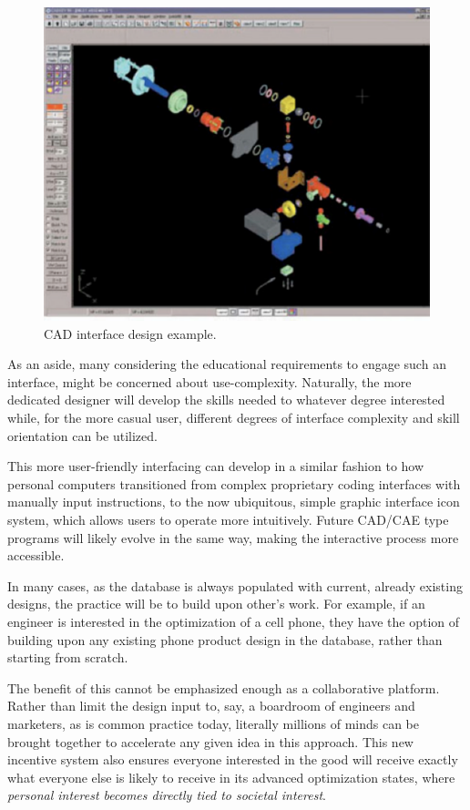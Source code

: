 \documentclass[10pt, a4paper, cleardoubleempty, openright, twoside]{book}
\begin{document}
\begin{figure}[bt!]
	\includegraphics[width=\textwidth]{figures/CAD-design-example.pdf}
	\caption {CAD interface design example.}
	\label{fig:cadExample}
\end{figure}
 
As an aside, many considering the educational requirements to engage
such an interface, might be concerned about use-complexity. Naturally,
the more dedicated designer will develop the skills needed to whatever
degree interested while, for the more casual user, different degrees of
interface complexity and skill orientation can be utilized.

This more user-friendly interfacing can develop in a similar fashion to
how personal computers transitioned from complex proprietary coding
interfaces with manually input instructions, to the now ubiquitous,
simple graphic interface icon system, which allows users to operate more
intuitively. Future CAD/CAE type programs will likely evolve in the same
way, making the interactive process more accessible.

In many cases, as the database is always populated with current, already
existing designs, the practice will be to build upon other's work. For
example, if an engineer is interested in the optimization of a cell
phone, they have the option of building upon any existing phone product
design in the database, rather than starting from scratch.

The benefit of this cannot be emphasized enough as a collaborative
platform. Rather than limit the design input to, say, a boardroom of
engineers and marketers, as is common practice today, literally millions
of minds can be brought together to accelerate any given idea in this
approach. This new incentive system also ensures everyone interested in
the good will receive exactly what everyone else is likely to receive in
its advanced optimization states, where \emph{personal interest becomes
directly tied to societal interest}.
\end{document}
